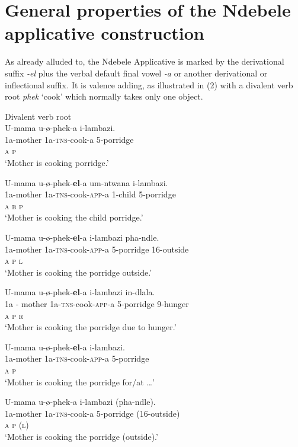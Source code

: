 \documentclass[output=paper]{langsci/langscibook}
\begin{document}
\section {General properties of the Ndebele applicative construction}

As already alluded to, the Ndebele Applicative is marked by the derivational suffix \textit{-el }plus the verbal default final vowel \textit{-a} or another derivational or inflectional suffix\textit{.} It is valence adding, as illustrated in (2) with a divalent verb root \textit{phek} ‘cook’ which normally takes only one object. 

\ea
{Divalent verb root }\\
\ea
\gll U-mama u-ø-phek-a i-lambazi.\\
 \textit {}1a-mother 1a-\textsc{tns}-cook-a 5-porridge\\
 \textsc{a p}\\
\glt ‘Mother is cooking porridge.’

\ex
\gll U-mama u-ø-phek-\textbf{el}-a um-ntwana i-lambazi. \\
 \textit {}1a-mother 1a-\textsc{tns}-cook-\textsc{app}-a 1-child 5-porridge\\
 \textit {}\textsc{a b p}\\
\glt ‘Mother is cooking the child porridge.’

\ex
\gll U-mama u-ø-phek-\textbf{el}-a i-lambazi pha-ndle.\\
 1a-mother 1a-\textsc{tns}-cook-\textsc{app}-a 5-porridge 16-outside\\
 \textsc{a p l}\\
\glt ‘Mother is cooking the porridge outside.’

\ex
\gll U-mama u-ø-phek-\textbf{el}-a i-lambazi in-dlala.\\
 1a - mother 1a-\textsc{tns}-cook-\textsc{app}-a 5-porridge 9-hunger\\
 \textsc{a p r}\\
\glt ‘Mother is cooking the porridge due to hunger.’

\ex
\gll *U-mama u-ø-phek-\textbf{el}-a i-lambazi.\\
 1a-mother 1a-\textsc{tns}-cook-\textsc{app}-a 5-porridge \\
 \textsc{a p}\\
\glt ‘Mother is cooking the porridge for/at …’

\ex
\gll U-mama u-ø-phek-a i-lambazi (pha-ndle).\\
 1a-mother 1a-\textsc{tns}-cook-a 5-porridge (16-outside)\\
 \textsc{a p (l)}\\
\glt ‘Mother is cooking the porridge (outside).’
\z
\z
\end{document}
